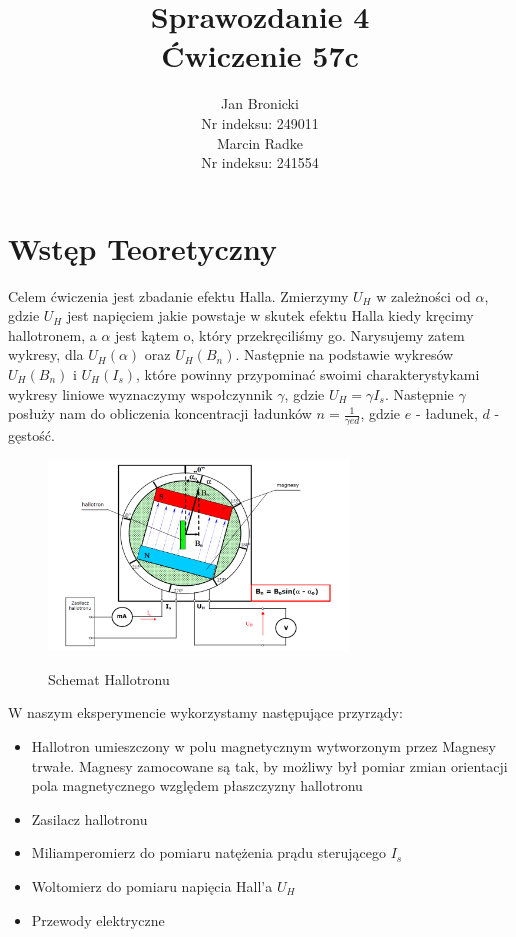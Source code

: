 \documentclass{article}
\title{Sprawozdanie 4\\ Ćwiczenie 57c}
\author{Jan Bronicki \\
Nr indeksu: 249011\\
Marcin Radke\\
Nr indeksu: 241554}
\date{}
\begin{document}
\maketitle
\section{Wstęp Teoretyczny}
\par Celem ćwiczenia jest zbadanie efektu Halla. Zmierzymy $U_{H}$ w zależności od $\alpha$, gdzie $U_{H}$ jest napięciem jakie powstaje w skutek efektu Halla kiedy kręcimy hallotronem, a $\alpha$ jest kątem o, który przekręciliśmy go. Narysujemy zatem wykresy, dla $U_{H}(\alpha)$ oraz $U_{H}(B_{n})$. Następnie na podstawie wykresów $U_{H}(B_{n})$ i $U_{H}(I_{s})$, które powinny przypominać swoimi charakterystykami wykresy liniowe wyznaczymy wspołczynnik $\gamma$, gdzie $U_{H}=\gamma I_{s}$. Następnie $\gamma$ posłuży nam do obliczenia koncentracji ładunków $n=\frac{1}{\gamma e d}$, gdzie $e$ - ładunek, $d$ - gęstość.

\begin{figure}[h]
    \centering
    \caption{Schemat Hallotronu}
    \includegraphics[width=8cm]{schemat_hallotronu.png}
    \label{fig:rys1}
\end{figure}

W naszym eksperymencie wykorzystamy następujące przyrządy:
\begin{itemize}
    \item Hallotron umieszczony w polu magnetycznym wytworzonym przez Magnesy trwałe. Magnesy zamocowane są         tak, by możliwy był pomiar zmian orientacji pola magnetycznego względem płaszczyzny hallotronu
    \item Zasilacz hallotronu
    \item Miliamperomierz do pomiaru natężenia prądu sterującego $I_{s}$
    \item Woltomierz do pomiaru napięcia Hall'a $U_{H}$
    \item Przewody elektryczne
\end{itemize}
\end{document}
